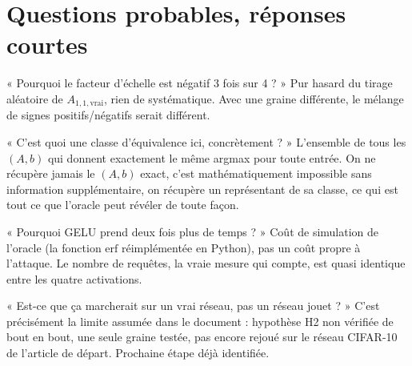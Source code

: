 \documentclass[11pt]{article}
\begin{document}
\section{Questions probables, réponses courtes}

\begin{question}{« Pourquoi le facteur d'échelle est négatif 3 fois sur 4 ? »}
Pur hasard du tirage aléatoire de $A_{1,1,\text{vrai}}$, rien de
systématique. Avec une graine différente, le mélange de signes
positifs/négatifs serait différent.
\end{question}

\begin{question}{« C'est quoi une classe d'équivalence ici, concrètement ? »}
L'ensemble de tous les $(A,b)$ qui donnent exactement le même argmax pour
toute entrée. On ne récupère jamais le $(A,b)$ exact, c'est mathématiquement
impossible sans information supplémentaire, on récupère un représentant de
sa classe, ce qui est tout ce que l'oracle peut révéler de toute façon.
\end{question}

\begin{question}{« Pourquoi GELU prend deux fois plus de temps ? »}
Coût de simulation de l'oracle (la fonction $\mathrm{erf}$ réimplémentée en
Python), pas un coût propre à l'attaque. Le nombre de requêtes, la vraie
mesure qui compte, est quasi identique entre les quatre activations.
\end{question}

\begin{question}{« Est-ce que ça marcherait sur un vrai réseau, pas un réseau jouet ? »}
C'est précisément la limite assumée dans le document : hypothèse H2 non
vérifiée de bout en bout, une seule graine testée, pas encore rejoué sur le
réseau CIFAR-10 de l'article de départ. Prochaine étape déjà identifiée.
\end{question}
\end{document}
